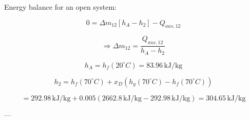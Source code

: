 Energy balance for an open system:  

\[
0 = \Delta m_{12} \left[ h_{A} - h_{2} \right] - Q_{aus,12}
\]

\[
\Rightarrow \Delta m_{12} = \frac{Q_{aus,12}}{h_{A} - h_{2}}
\]

\[
h_{A} = h_f (20^\circ C) = 83.96 \, \text{kJ/kg}
\]

\[
h_{2} = h_f (70^\circ C) + x_D \left( h_g (70^\circ C) - h_f (70^\circ C) \right)
\]

\[
= 292.98 \, \text{kJ/kg} + 0.005 \left( 2662.8 \, \text{kJ/kg} - 292.98 \, \text{kJ/kg} \right) = 304.65 \, \text{kJ/kg}
\]

---